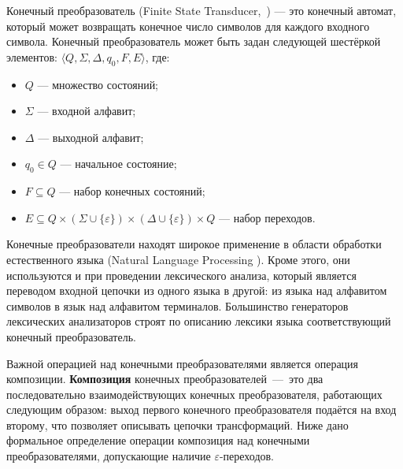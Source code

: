 \begin{mydef}

Конечный преобразователь (Finite State Transducer,~\cite{FST}) {---} это конечный автомат, который может возвращать конечное число символов для каждого входного символа. Конечный преобразователь может быть задан следующей шестёркой элементов: $\langle Q, \Sigma, \Delta, q_0, F, E \rangle$, где:

\begin{itemize}
\item $Q$ --- множество состояний; 
\item $\Sigma$ --- входной алфавит;
\item $\Delta$ --- выходной алфавит; 
\item $q_0 \in Q$ --- начальное состояние;
\item $F \subseteq Q$ --- набор конечных состояний; 
\item $E \subseteq Q \times (\Sigma \cup \{\varepsilon\}) \times (\Delta \cup \{\varepsilon\})  \times Q$ --- набор переходов. 
\end{itemize}

\end{mydef}

Конечные преобразователи находят широкое применение в области обработки естественного языка (Natural Language Processing \cite{Mohri}). Кроме этого, они используются и при проведении лексического анализа, который является переводом входной цепочки из одного языка в другой: из языка над алфавитом символов в язык над алфавитом терминалов. Большинство генераторов лексических анализаторов строят по описанию лексики языка соответствующий конечный преобразователь.

Важной операцией над конечными преобразователями является операция композиции. \textbf{Композиция} конечных преобразователей~{---}~это два последовательно  взаимодействующих конечных преобразователя, работающих следующим образом: выход первого конечного преобразователя подаётся на вход второму, что позволяет описывать цепочки трансформаций. Ниже дано формальное определение операции композиция над конечными преобразователями, допускающие наличие $\varepsilon$-переходов.

